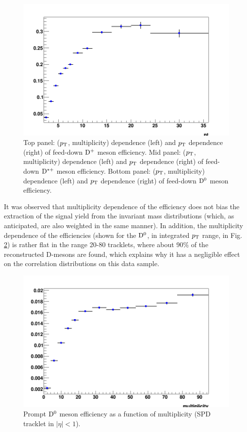 \begin{figure}[h]
	\includegraphics[width=.48\linewidth]{figures/Effs/EfficiencyMap_1D_Dzero_b_RefPtBins_wLimAcc_Plot.png}
	\caption{Top panel: ($p_{\rm T}$, multiplicity) dependence (left) and $p_{\rm T}$ dependence (right) of feed-down ${\rm D^+}$ meson efficiency.
Mid panel: ($p_{\rm T}$, multiplicity) dependence (left) and $p_{\rm T}$ dependence (right) of feed-down ${\rm D^{*+}}$ meson efficiency.
Bottom panel: ($p_{\rm T}$, multiplicity) dependence (left) and $p_{\rm T}$ dependence (right) of feed-down ${\rm D^0}$ meson efficiency.}
	\label{fig:dEffFD}	
\end{figure}
\clearpage

It was observed that multiplicity dependence of the efficiency does not bias the extraction of the signal yield from the invariant mass distributions (which, as anticipated, are also weighted in the same manner). In addition, the multiplicity dependence of the efficiencies (shown for the ${\rm D^0}$, in integrated $p_{\rm T}$ range, in Fig. \ref{fig:DeffY}) is rather flat in the range 20-80 tracklets, where about 90\% of the reconstructed D-mesons are found, which explains why it has a negligible effect on the correlation distributions on this data sample.
\begin{figure}[h]   %
	\centering
	\includegraphics[width=.48\linewidth]{figures/Effs/EfficiencyMap_1D_Dzero_c_RefPtBins_Ydep_wLimAcc_Plot.png}
\caption{Prompt ${\rm D^0}$ meson efficiency as a function of multiplicity (SPD tracklet in $|\eta|<1$).}
	\label{fig:DeffY}	
\end{figure}
\clearpage 
